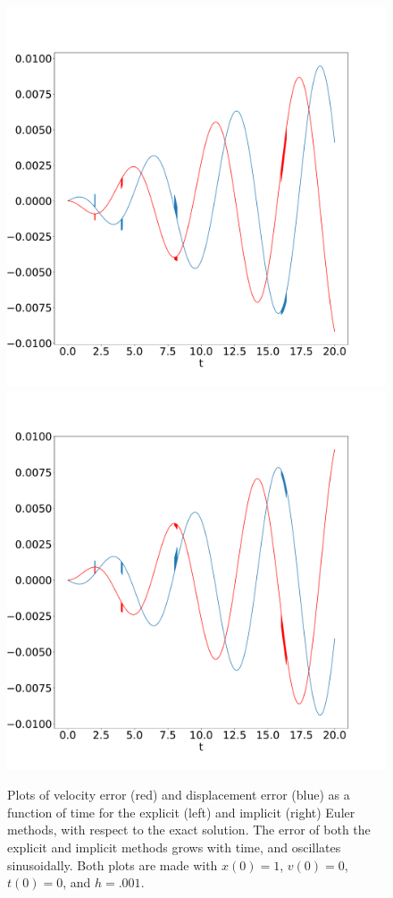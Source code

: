 \documentclass[11pt, oneside]{article}   	%
\begin{document}
\begin{section}
\begin{figure}[H]
\includegraphics[width=.5\textwidth, height=.35\textheight]{errorPlot1.pdf}
\includegraphics[width=.5\textwidth, height=.35\textheight]{errorPlot2.pdf}
\caption{Plots of velocity error (red) and displacement error (blue) as a function of time for the explicit (left) and implicit (right) Euler methods, with respect to the exact solution. The error of both the explicit and implicit methods grows with time, and oscillates sinusoidally. Both plots are made with $x(0) = 1$, $v(0) = 0$, $t(0) = 0$, and $h = .001$.}
\end{figure}


\end{section}
\end{document}
